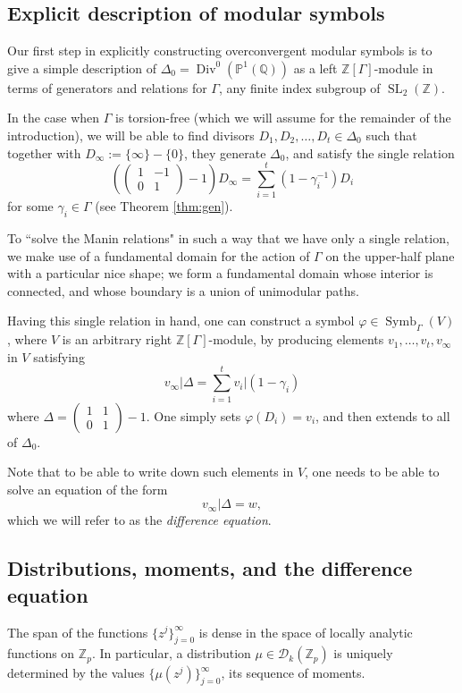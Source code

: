 \documentclass{amsart}
\theoremstyle{plain}
\theoremstyle{definition}
\newcommand{\D}{{\mathcal D}}
\newcommand{\Z}{{\mathbb Z}}
\newcommand{\Q}{{\mathbb Q}}
\renewcommand{\P}{{\mathbb P}}
\newcommand{\Zp}{\Z_p}
\newcommand{\psmallmat}[4]{\left( \begin{smallmatrix} #1 & #2 \\ #3 & #4 \end{smallmatrix} \right)}
\newcommand{\Dvla}[1]{\D_{#1}(\Zp)}
\newcommand{\Dkla}{\Dvla{k}}
\DeclareMathOperator{\Div}{Div}
\DeclareMathOperator{\SL}{SL}
\DeclareMathOperator{\Symb}{Symb}
\newcommand{\MS}[1]{\Symb_{\Gamma}(#1)}
\begin{document}
\subsection{Explicit description of modular symbols}

Our first step in explicitly constructing overconvergent modular symbols is to give a simple description of $\Delta_0 = \Div^0(\P^1(\Q))$ as a left $\Z[\Gamma]$-module in terms of generators and relations for $\Gamma$, any finite index subgroup of $\SL_2(\Z)$.  

In the case when $\Gamma$ is torsion-free (which we will assume for the remainder of the introduction), we will be able to find divisors $D_1, D_2,\dots, D_t \in \Delta_0$ such that together with  $D_\infty := \{ \infty \} - \{0\}$, they generate $\Delta_0$, and satisfy the single relation
$$
\left(\psmallmat{1}{-1}{0}{1} - 1\right) D_\infty = 
\sum_{i=1}^t (1-\gamma_i^{-1}) D_i
$$
for some $\gamma_i \in \Gamma$ (see Theorem \ref{thm:gen}).

To ``solve the Manin relations" in such a way that we have only a single relation, we make use of a fundamental domain for the action of $\Gamma$ on the upper-half plane with a particular nice shape; we form a fundamental domain whose interior is connected, and whose boundary is a union of unimodular paths.  

Having this single relation in hand, one can construct a symbol $\varphi \in \MS{V}$, where $V$ is an arbitrary right $\Z[\Gamma]$-module, by producing elements $v_1, \dots, v_t, v_\infty$ in $V$ satisfying 
$$
v_\infty \big| \Delta = \sum_{i=1}^t v_i \big| (1-\gamma_i)
$$
where $\Delta = \psmallmat{1}{1}{0}{1} - 1$.  One simply sets $\varphi(D_i) = v_i$, and then extends to all of $\Delta_0$.

Note that to be able to write down such elements in $V$, one needs to be able to solve an equation of the form 
$$
v_\infty  \big| \Delta = w,
$$ 
which we will refer to as the {\it difference equation}.

\subsection{Distributions, moments, and the difference equation}

The span of the functions $\{ z^j \}_{j=0}^\infty$ is dense in the space of locally analytic functions on $\Zp$.  In particular, a distribution $\mu \in \Dkla$ is uniquely determined by the values $\{ \mu(z^j) \}_{j=0}^\infty$, its sequence of moments.  
\end{document}
